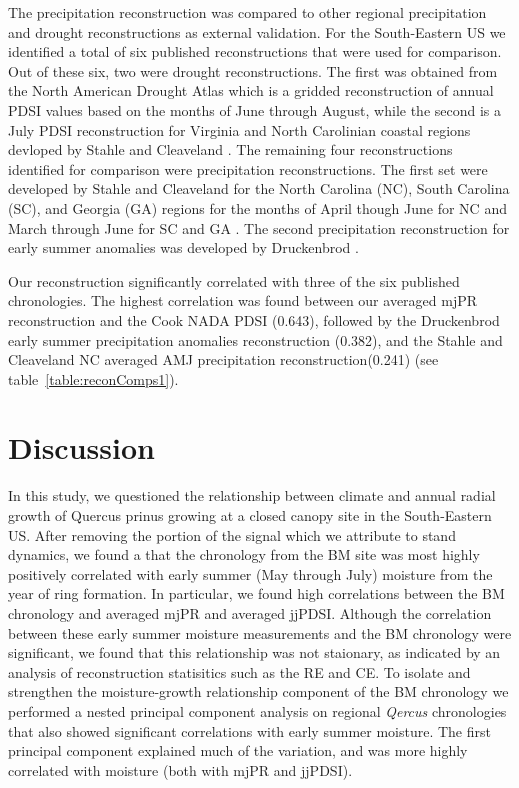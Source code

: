 \documentclass[11pt]{article}
\begin{document}
The precipitation reconstruction was compared to other regional precipitation and drought reconstructions as external validation. For the South-Eastern US we identified a total of six published reconstructions that were used for comparison. Out of these six, two were drought reconstructions. The first was obtained from the North American Drought Atlas \cite{cook1999drought} which is a gridded reconstruction of annual PDSI values based on the months of June through August, while the second is a July PDSI reconstruction for Virginia and North Carolinian coastal regions devloped by Stahle and Cleaveland \cite{stahle1998lost}. The remaining four reconstructions identified for comparison were precipitation reconstructions. The first set were developed by Stahle and Cleaveland for the North Carolina (NC), South Carolina (SC), and Georgia (GA) regions for the months of April though June for NC and March through June for SC and GA \cite{stahle1992reconstruction}. The second precipitation reconstruction for early summer anomalies was developed by Druckenbrod \cite{druckenbrod2003late}. 

Our reconstruction significantly correlated with three of the six published chronologies. The highest correlation was found between our averaged mjPR reconstruction and the Cook NADA PDSI (0.643), followed by the Druckenbrod early summer precipitation anomalies reconstruction (0.382), and the Stahle and Cleaveland NC averaged AMJ precipitation reconstruction(0.241) (see table~\ref{table:reconComps1}). 



\section{Discussion}
\label{sec:discussion}

In this study, we questioned the relationship between climate and annual radial growth of Quercus prinus growing at a closed canopy site in the South-Eastern US. After removing the portion of the signal which we attribute to stand dynamics, we found a that the chronology from the BM site was most highly positively correlated with early summer (May through July) moisture from the year of ring formation. In particular, we found high correlations between the BM chronology and averaged mjPR and averaged jjPDSI. Although the correlation between these early summer moisture measurements and the BM chronology were significant, we found that this relationship was not staionary, as indicated by an analysis of reconstruction statisitics such as the RE and CE. To isolate and strengthen the moisture-growth relationship component of the BM chronology we performed a nested principal component analysis on regional \textit{Qercus} chronologies that also showed significant correlations with early summer moisture. The first principal component explained much of the variation, and was more highly correlated with moisture (both with mjPR and jjPDSI). 
\end{document}
